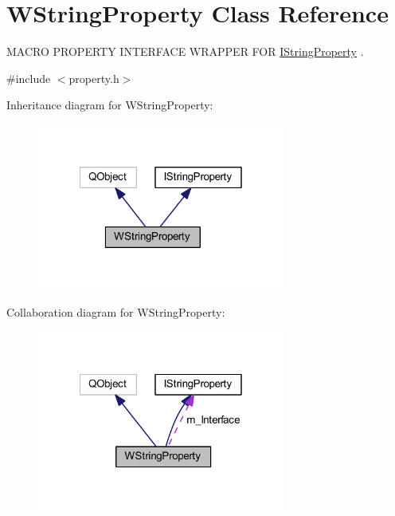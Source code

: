 \hypertarget{class_w_string_property}{\section{W\-String\-Property Class Reference}
\label{class_w_string_property}
}


M\-A\-C\-R\-O P\-R\-O\-P\-E\-R\-T\-Y I\-N\-T\-E\-R\-F\-A\-C\-E W\-R\-A\-P\-P\-E\-R F\-O\-R \hyperlink{class_i_string_property}{I\-String\-Property} .  




{\ttfamily \#include $<$property.\-h$>$}



Inheritance diagram for W\-String\-Property\-:
\nopagebreak
\begin{figure}[H]
\begin{center}
\leavevmode
\includegraphics[width=231pt]{class_w_string_property__inherit__graph}
\end{center}
\end{figure}


Collaboration diagram for W\-String\-Property\-:
\nopagebreak
\begin{figure}[H]
\begin{center}
\leavevmode
\includegraphics[width=231pt]{class_w_string_property__coll__graph}
\end{center}
\end{figure}
